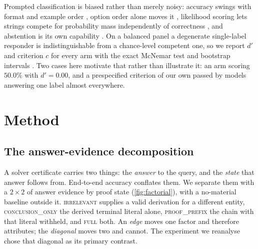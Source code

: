 \documentclass[10pt,twocolumn]{article}
\begin{document}
Prompted classification is biased rather than merely noisy: accuracy swings with
format and example order \citep{zhao2021calibrate}, option order alone moves it
\citep{pezeshkpour2023large,zheng2023large}, likelihood scoring lets strings
compete for probability mass independently of correctness
\citep{holtzman2021surface}, and abstention is its own capability
\citep{kadavath2022language,yin2023large}. On a balanced panel a degenerate
single-label responder is indistinguishable from a chance-level competent one,
so we report $d'$ and criterion $c$ for every arm
\citep{macmillan1991detection,stanislaw1999calculation} with the exact McNemar
test \citep{mcnemar1947note} and bootstrap intervals \citep{efron1987better}.
Two cases here motivate that rather than illustrate it: an arm scoring $50.0\%$
with $d' = 0.00$, and a prespecified criterion of our own passed by models
answering one label almost everywhere.

\section{Method}

\subsection{The answer-evidence decomposition}

A solver certificate carries two things: the \emph{answer} to the query, and the
\emph{state} that answer follows from. End-to-end accuracy conflates them. We
separate them with a $2\times2$ of answer evidence by proof state
(\cref{fig:factorial}), with a no-material baseline outside it.
\textsc{irrelevant} supplies a valid derivation for a different entity,
\textsc{conclusion\_only} the derived terminal literal alone,
\textsc{proof\_prefix} the chain with that literal withheld, and \textsc{full}
both. An \emph{edge} moves one factor and therefore attributes; the
\emph{diagonal} moves two and cannot. The experiment we reanalyse chose that
diagonal as its primary contrast.
\end{document}
